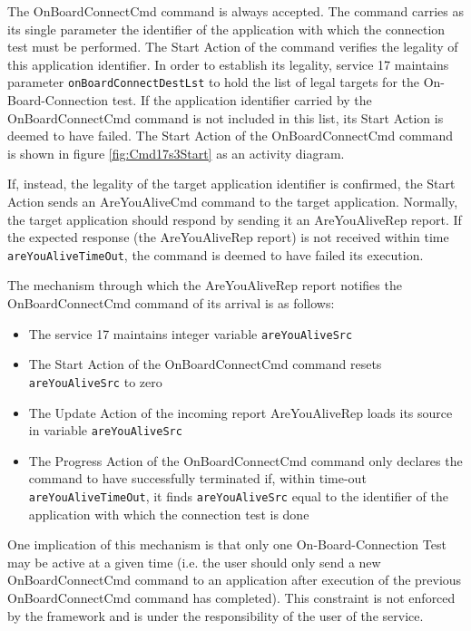 \documentclass{pnp_article}
\begin{document}
The OnBoardConnectCmd command is always accepted. The command carries as its single parameter the identifier of the application with which the connection test must be performed. The Start Action of the command verifies the legality of this application identifier. In order to establish its legality, service 17 maintains parameter \texttt{onBoardConnectDestLst} to hold the list of legal targets for the On-Board-Connection test. If the application identifier carried by the OnBoardConnectCmd command is not included in this list, its Start Action is deemed to have failed. The Start Action of the OnBoardConnectCmd command is shown in figure \ref{fig:Cmd17s3Start} as an activity diagram.

If, instead, the legality of the target application identifier is confirmed, the Start Action sends an AreYouAliveCmd command to the target application. Normally, the target application should respond by sending it an AreYouAliveRep report. If the expected response (the AreYouAliveRep report) is not received within time \texttt{areYouAliveTimeOut}, the command is deemed to have failed its execution.

The mechanism through which the AreYouAliveRep report notifies the OnBoardConnectCmd command of its arrival is as follows:

\begin{itemize}
\item The service 17 maintains integer variable \texttt{areYouAliveSrc}
\item The Start Action of the OnBoardConnectCmd command resets \texttt{areYouAliveSrc} to zero
\item The Update Action of the incoming report AreYouAliveRep loads its source in variable \texttt{areYouAliveSrc}
\item The Progress Action of the OnBoardConnectCmd command only declares the command to have successfully terminated if, within time-out \texttt{areYouAliveTimeOut}, it finds \texttt{areYouAliveSrc} equal to the identifier of the application with which the connection test is done
\end{itemize}

One implication of this mechanism is that only one On-Board-Connection Test may be active at a given time (i.e. the user should only send a new OnBoardConnectCmd command to an application after execution of the previous OnBoardConnectCmd command has completed). This constraint is not enforced by the framework and is under the responsibility of the user of the service.
\end{document}
